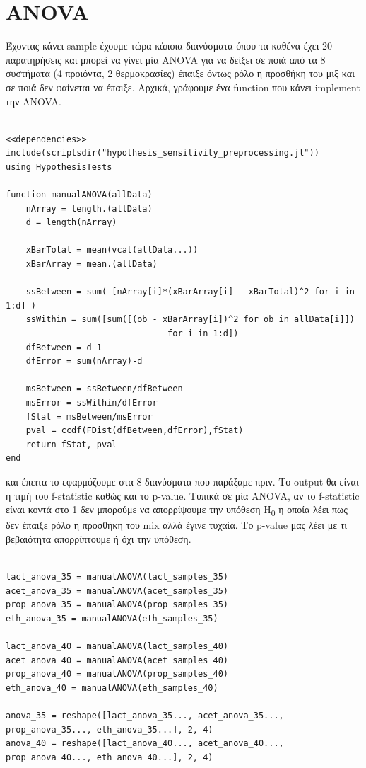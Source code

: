 \documentclass[11pt]{article}
\begin{document}
\section{ANOVA}
\label{sec:org152c7a5}
Έχοντας κάνει sample έχουμε τώρα κάποια διανύσματα όπου τα καθένα έχει 20 παρατηρήσεις και μπορεί να γίνει μία ANOVA για να δείξει σε ποιά από τα 8 συστήματα (4 προιόντα, 2 θερμοκρασίες) έπαιξε όντως ρόλο η προσθήκη του μιξ και σε ποιά δεν φαίνεται να έπαιξε. Αρχικά, γράφουμε ένα function που κάνει implement την ANOVA.

\begin{verbatim}

<<dependencies>>
include(scriptsdir("hypothesis_sensitivity_preprocessing.jl"))
using HypothesisTests

function manualANOVA(allData)
    nArray = length.(allData)
    d = length(nArray)

    xBarTotal = mean(vcat(allData...))
    xBarArray = mean.(allData)

    ssBetween = sum( [nArray[i]*(xBarArray[i] - xBarTotal)^2 for i in 1:d] )
    ssWithin = sum([sum([(ob - xBarArray[i])^2 for ob in allData[i]])
                                for i in 1:d])
    dfBetween = d-1
    dfError = sum(nArray)-d

    msBetween = ssBetween/dfBetween
    msError = ssWithin/dfError
    fStat = msBetween/msError
    pval = ccdf(FDist(dfBetween,dfError),fStat)
    return fStat, pval
end

\end{verbatim}

και έπειτα το εφαρμόζουμε στα 8 διανύσματα που παράξαμε πριν. Το output θα είναι η τιμή του f-statistic καθώς και το p-value. Τυπικά σε μία ANOVA, αν το f-statistic είναι κοντά στο 1 δεν μπορούμε να απορρίψουμε την υπόθεση H\textsubscript{0} η οποία λέει πως δεν έπαιξε ρόλο η προσθήκη του mix αλλά έγινε τυχαία. Το p-value μας λέει με τι βεβαιότητα απορρίπτουμε ή όχι την υπόθεση.

\begin{verbatim}

lact_anova_35 = manualANOVA(lact_samples_35)
acet_anova_35 = manualANOVA(acet_samples_35)
prop_anova_35 = manualANOVA(prop_samples_35)
eth_anova_35 = manualANOVA(eth_samples_35)

lact_anova_40 = manualANOVA(lact_samples_40)
acet_anova_40 = manualANOVA(acet_samples_40)
prop_anova_40 = manualANOVA(prop_samples_40)
eth_anova_40 = manualANOVA(eth_samples_40)

anova_35 = reshape([lact_anova_35..., acet_anova_35..., prop_anova_35..., eth_anova_35...], 2, 4)
anova_40 = reshape([lact_anova_40..., acet_anova_40..., prop_anova_40..., eth_anova_40...], 2, 4)

\end{verbatim}
\end{document}
